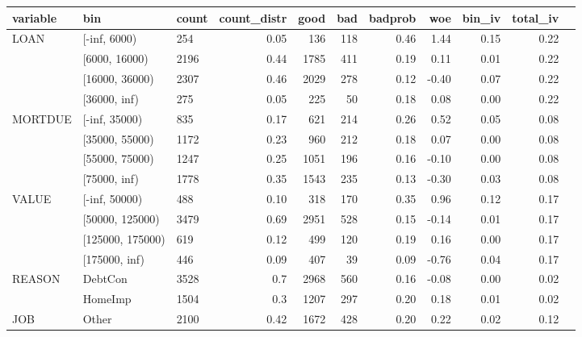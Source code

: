 \begin{landscape}
	\begin{figure}[!ht]
		\centering
		\begin{tabular}{lllrrrrrrrr}
			\toprule
			variable & bin &  count &  count\_distr &  good &  bad &   badprob &       woe &    bin\_iv &  total\_iv \\
			\midrule
			LOAN &      [-inf, 6000) &    254 &         0.05 &   136 &  118 &     0.46 &  1.44 &    0.15 &      0.22 \\
			 &   [6000, 16000) &   2196 &         0.44 &  1785 &  411 &     0.19 &  0.11 &    0.01 &      0.22 \\
			 &  [16000, 36000) &   2307 &         0.46 &  2029 &  278 &     0.12 & -0.40 &    0.07 &      0.22  \\
			 &      [36000, inf) &    275 &         0.05 &   225 &   50 &     0.18 &  0.08 &    0.00 &      0.22  \\
			\midrule
			  MORTDUE &     [-inf, 35000) &    835 &         0.17 &   621 &  214 &     0.26 &  0.52 &    0.05 &      0.08  \\
			  &  [35000, 55000) &   1172 &         0.23 &   960 &  212 &     0.18 &  0.07 &    0.00 &      0.08  \\
			   &  [55000, 75000) &   1247 &         0.25 &  1051 &  196 &     0.16 & -0.10 &    0.00 &      0.08  \\
			   &      [75000, inf) &   1778 &         0.35 &  1543 &  235 &     0.13 & -0.30 &    0.03 &      0.08  \\
			\midrule
			    VALUE &       [-inf, 50000) &    488 &         0.10 &   318 &  170 &     0.35 &  0.96 &    0.12 &      0.17  \\
			     &   [50000, 125000) &   3479 &         0.69 &  2951 &  528 &     0.15 & -0.14 &    0.01 &      0.17  \\
			     &  [125000, 175000) &    619 &         0.12 &   499 &  120 &     0.19 &  0.16 &    0.00 &      0.17  \\
			     &       [175000, inf) &    446 &         0.09 &   407 &   39 &     0.09 & -0.76 &    0.04 &      0.17  \\
			\midrule
			  REASON &  DebtCon &   3528 &          0.7 &  2968 &  560 &     0.16 & -0.08 &    0.00 &      0.02  \\
			    &  HomeImp &   1504 &          0.3 &  1207 &  297 &     0.20 &  0.18 &    0.01 &      0.02  \\
			\midrule
			     JOB &    Other &   2100 &         0.42 &  1672 &  428 &     0.20 &  0.22 &    0.02 &      0.12  \\

\end{tabular}
\end{figure}
\end{landscape}
